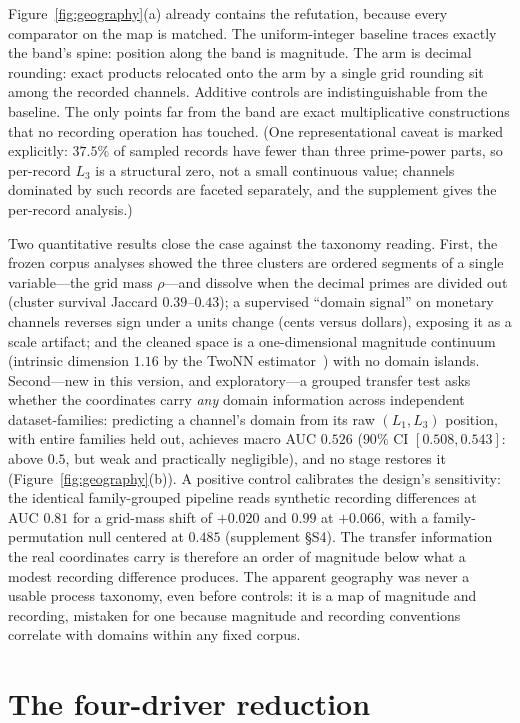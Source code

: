 \documentclass[12pt]{article}
\newcommand{\rmass}{\rho}
\begin{document}
Figure~\ref{fig:geography}(a) already contains the refutation, because every
comparator on the map is matched. The uniform-integer baseline traces exactly
the band's spine: position along the band is magnitude. The arm is decimal
rounding: exact products relocated onto the arm by a single grid rounding sit
among the recorded channels. Additive controls are indistinguishable from the
baseline. The only points far from the band are exact multiplicative
constructions that no recording operation has touched. (One representational
caveat is marked explicitly: $37.5\%$ of sampled records have fewer than three
prime-power parts, so per-record $L_3$ is a structural zero, not a small
continuous value; channels dominated by such records are faceted separately,
and the supplement gives the per-record analysis.)

Two quantitative results close the case against the taxonomy reading. First,
the frozen corpus analyses showed the three clusters are ordered segments of a
single variable---the grid mass $\rmass$---and dissolve when the decimal
primes are divided out (cluster survival Jaccard $0.39$--$0.43$); a supervised
``domain signal'' on monetary channels reverses sign under a units change
(cents versus dollars), exposing it as a scale artifact; and the cleaned space
is a one-dimensional magnitude continuum (intrinsic dimension $1.16$ by the
TwoNN estimator~\citep{facco2017}) with no
domain islands. Second---new in this version, and exploratory---a grouped
transfer test asks whether the coordinates carry \emph{any} domain information
across independent dataset-families: predicting a channel's domain from its
raw $(L_1, L_3)$ position, with entire families held out, achieves macro AUC
$0.526$ ($90\%$ CI $[0.508, 0.543]$: above $0.5$, but weak and practically
negligible), and no stage restores it
(Figure~\ref{fig:geography}(b)). A positive control calibrates the design's
sensitivity: the identical family-grouped pipeline reads synthetic recording
differences at AUC $0.81$ for a grid-mass shift of $+0.020$ and $0.99$ at
$+0.066$, with a family-permutation null centered at $0.485$ (supplement
\S S4). The transfer information the real coordinates carry is
therefore an order of magnitude below what a modest recording difference
produces. The apparent geography was never a usable process taxonomy, even
before controls: it is a map of magnitude and recording, mistaken for one
because magnitude and recording conventions correlate with domains within
any fixed corpus.

\section{The four-driver reduction}
\label{sec:drivers}
\end{document}
